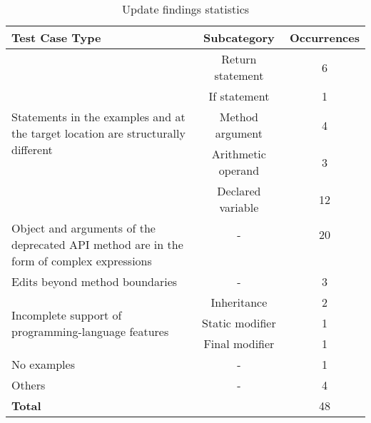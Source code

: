 \begin{table}
\caption{Update findings statistics}
\begin{center}
\begin{tabular}{ | p{12em} |c|c| } 
 \hline
 \textbf{Test Case Type} & \textbf{Subcategory} & \textbf{Occurrences} \\ 
 \hline
 \multirow{5}{12em}{Statements in the examples and at the target location are structurally different} & Return statement & 6 \\\cline{2-3} & If statement & 1 \\\cline{2-3} & Method argument & 4 \\\cline{2-3} & Arithmetic operand & 3 \\\cline{2-3}  & Declared variable & 12 \\\cline{2-3} 
 \hline
  \multirow{4}{12em}{Object and arguments of the deprecated API method are in the form of complex expressions} & - & 20\\&&\\&&\\&&\\
 \hline
 Edits beyond method boundaries & - & 3\\
\hline
 \multirow{3}{12em}{Incomplete support of programming-language features} & Inheritance & 2\\\cline{2-3} & Static modifier & 1 \\\cline{2-3} & Final modifier & 1\\\cline{2-3}
 \hline
 No examples & - & 1\\
 \hline
 Others & - & 4\\
 \hline
 \multicolumn{2}{|l|}{\bf Total} & 48\\
 \hline
\end{tabular}
\end{center}
\label{table:data_statistic}
\end{table}

